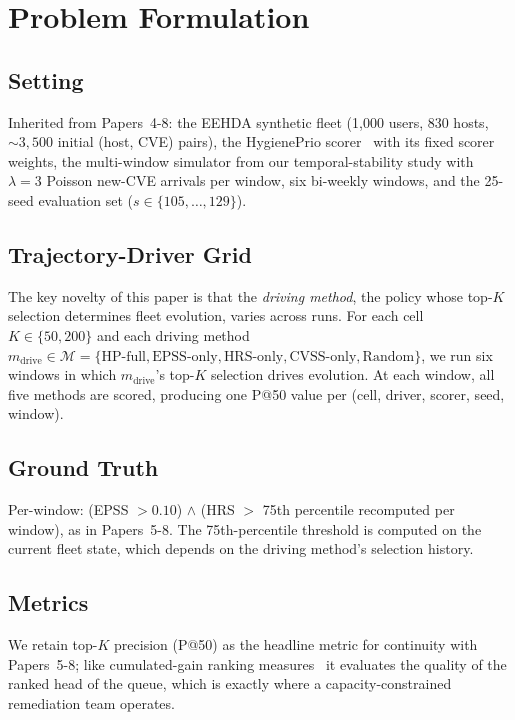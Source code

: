 \section{Problem Formulation}
\label{sec:problem}

\subsection{Setting}

Inherited from Papers~4-8: the EEHDA synthetic fleet (1{,}000 users,
830 hosts, $\sim 3{,}500$ initial (host, CVE) pairs), the HygienePrio
scorer~\cite{paper4hygieneprio} with its fixed scorer weights, the
multi-window simulator from our temporal-stability study with $\lambda = 3$ Poisson
new-CVE arrivals per window, six bi-weekly windows, and the 25-seed
evaluation set ($s \in \{105, \ldots, 129\}$).

\subsection{Trajectory-Driver Grid}

The key novelty of this paper is that the \textit{driving method}, 
the policy whose top-$K$ selection determines fleet evolution, varies
across runs. For each cell $K \in \{50, 200\}$ and each driving method
$m_{\text{drive}} \in \mathcal{M} = \{\text{HP-full}, \text{EPSS-only},
\text{HRS-only}, \text{CVSS-only}, \text{Random}\}$, we run six windows
in which $m_{\text{drive}}$'s top-$K$ selection drives evolution. At
each window, all five methods are scored, producing one P@50 value per
(cell, driver, scorer, seed, window).

\subsection{Ground Truth}

Per-window: (EPSS $> 0.10$) $\wedge$ (HRS $>$ 75th percentile recomputed
per window), as in Papers~5-8. The 75th-percentile threshold is computed
on the current fleet state, which depends on the driving method's
selection history.

\subsection{Metrics}

We retain top-$K$ precision (P@50) as the headline metric for continuity
with Papers~5-8; like cumulated-gain ranking measures~\cite{jarvelin2002cumulated}
it evaluates the quality of the ranked head of the queue, which is exactly
where a capacity-constrained remediation team operates.

